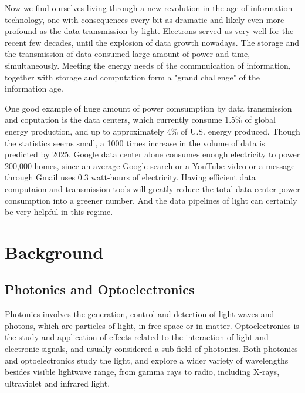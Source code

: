 Now we find ourselves living through a new revolution in the age of information
technology, one with consequences every bit as dramatic and likely even more
profound as the data transmission by light. Electrons served us very well for
the recent few decades, until the explosion of data growth nowadays. The storage
and the transmission of data consumed large amount of power and time,
simultaneously. Meeting the energy needs of the commnuication of information,
together with storage and computation form a "grand challenge" of the
information age.

One good example of huge amount of power comsumption by data transmission and
coputation is the data centers, which currently consume 1.5\% of global energy
production, and up to approximately 4\% of U.S. energy produced. Though the
statistics seems small, a 1000 times increase in the volume of data is
predicted by 2025. Google data center alone consumes enough electricity to
power 200,000 homes, since an average Google search or a YouTube video or a
message through Gmail uses 0.3 watt-hours of electricity. Having efficient data
computaion and transmission tools will greatly reduce the total data center
power consumption into a greener number. And the data pipelines of light can
certainly be very helpful in this regime.


\section{Background} \label{sec:intro_BG}

\subsection{Photonics and Optoelectronics}

Photonics involves the generation, control and detection of light waves and
photons, which are particles of light, in free space or in matter.
Optoelectronics is the study and application of effects related to the
interaction of light and electronic signals, and usually considered a sub-field
of photonics. Both photonics and optoelectronics study the light, and explore a
wider variety of wavelengths besides visible lightwave range, from gamma rays
to radio, including X-rays, ultraviolet and infrared light.

